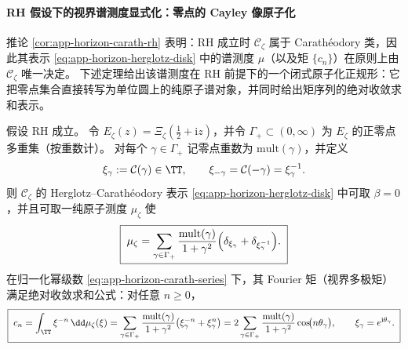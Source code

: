 \paragraph{RH 假设下的视界谱测度显式化：零点的 Cayley 像原子化}
推论 \ref{cor:app-horizon-carath-rh} 表明：RH 成立时 \(\mathscr{C}_{\zeta}\) 属于 Carath\'eodory 类，因此其表示 \eqref{eq:app-horizon-herglotz-disk} 中的谱测度 \(\mu\)（以及矩 \(\{c_n\}\)）在原则上由 \(\mathscr{C}_{\zeta}\) 唯一决定。
下述定理给出该谱测度在 RH 前提下的一个闭式原子化正规形：它把零点集合直接转写为单位圆上的纯原子谱对象，并同时给出矩序列的绝对收敛求和表示。

\begin{theorem}[RH 假设下的视界谱测度原子化公式]\label{thm:app-horizon-spectral-measure-atomic}
假设 RH 成立。
令 \(E_{\zeta}(z)=\Xi_{\zeta}(\tfrac12+\mathrm{i}z)\)，并令 \(\Gamma_+\subset(0,\infty)\) 为 \(E_{\zeta}\) 的正零点多重集（按重数计）。
对每个 \(\gamma\in\Gamma_+\) 记零点重数为 \(\mathrm{mult}(\gamma)\)，并定义
\[
\xi_{\gamma}:=\mathcal{C}(\gamma)\in\TT,
\qquad
\xi_{-\gamma}=\mathcal{C}(-\gamma)=\xi_{\gamma}^{-1}.
\]
则 \(\mathscr{C}_{\zeta}\) 的 Herglotz--Carath\'eodory 表示 \eqref{eq:app-horizon-herglotz-disk} 中可取 \(\beta=0\)，并且可取一纯原子测度 \(\mu_{\zeta}\) 使
\begin{equation}\label{eq:app-horizon-mu-atomic}
\boxed{\;
\mu_{\zeta}
=
\sum_{\gamma\in\Gamma_+}\frac{\mathrm{mult}(\gamma)}{1+\gamma^2}\Bigl(\delta_{\xi_{\gamma}}+\delta_{\xi_{\gamma}^{-1}}\Bigr).
\;}
\end{equation}
在归一化幂级数 \eqref{eq:app-horizon-carath-series} 下，其 Fourier 矩（视界多极矩）满足绝对收敛求和公式：对任意 \(n\ge 0\)，
\begin{equation}\label{eq:app-horizon-moment-sum}
\boxed{\;
c_n=\int_{\TT}\xi^{-n}\,\dd\mu_{\zeta}(\xi)
=
\sum_{\gamma\in\Gamma_+}\frac{\mathrm{mult}(\gamma)}{1+\gamma^2}\bigl(\xi_{\gamma}^{-n}+\xi_{\gamma}^{n}\bigr)
=
2\sum_{\gamma\in\Gamma_+}\frac{\mathrm{mult}(\gamma)}{1+\gamma^2}\cos\!\bigl(n\theta_{\gamma}\bigr),
\qquad \xi_{\gamma}=e^{\mathrm{i}\theta_{\gamma}}.
\;}
\end{equation}
\end{theorem}

